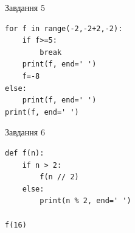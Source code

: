 \documentclass[12pt, ukrainian]{article}
\begin{document}
{\vspace{15mm}
\begin{minipage}[t]{9.7cm}                
{\begin{center}Завдання {5}\end{center}}
\begin{verbatim}
for f in range(-2,-2+2,-2):
    if f>=5:
        break
    print(f, end=' ')
    f=-8
else:
    print(f, end=' ')
print(f, end=' ')
\end{verbatim}     
\end{minipage}
\vline \hspace{8mm}
\begin{minipage}[t]{8.0cm}                
{\begin{center}Завдання {6}\end{center}}
\begin{verbatim}
def f(n):
    if n > 2:
        f(n // 2)
    else:
        print(n % 2, end=' ')

f(16)
\end{verbatim}     
\end{minipage}

}
\newpage
\end{document}

